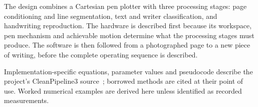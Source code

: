 \label{sec:design}
The design combines a Cartesian pen plotter with three processing stages: page conditioning and line segmentation, text and writer classification, and handwriting reproduction. The hardware is described first because its workspace, pen mechanism and achievable motion determine what the processing stages must produce. The software is then followed from a photographed page to a new piece of writing, before the complete operating sequence is described.

Implementation-specific equations, parameter values and pseudocode describe the project's CleanPipeline3 source~\cite{braunepipeline2026}; borrowed methods are cited at their point of use. Worked numerical examples are derived here unless identified as recorded measurements.\par








